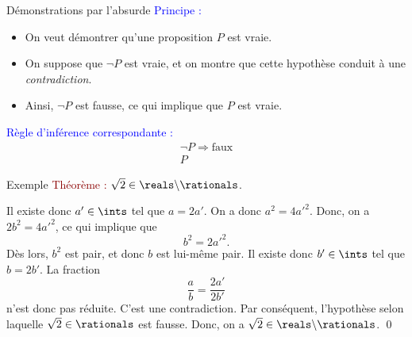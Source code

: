 \begin{frame}{Démonstrations par l'absurde}
\textcolor{blue}{Principe :}
\begin{itemize}
\item On veut démontrer qu'une proposition $P$ est vraie.
\item On suppose que $\neg P$ est vraie, et on montre que cette hypothèse
conduit à une {\em contradiction}.
\item Ainsi, $\neg P$ est fausse, ce qui implique que $P$ est vraie.
\end{itemize}

\bigskip

\textcolor{blue}{Règle d'inférence correspondante :}
\[
\begin{array}{c}
\neg P \Rightarrow \mbox{faux} \\ \hline
P
\end{array}
\] 
\end{frame}

\begin{frame}{Exemple}
\textcolor{darkred}{Théorème :} $\sqrt{2} \in \reals \backslash \rationals$.

\bigskip
{}

\end{frame}

\begin{frame}
Il existe donc $a' \in \ints$ tel que $a = 2a'$. On a
donc $a^2 = 4a'^2$.  Donc, on a $2b^2 = 4a'^2$, ce qui implique que
\[b^2 = 2a'^2.\]  Dès lors, $b^2$ est pair, et donc $b$ est lui-même pair.
Il existe donc $b' \in \ints$ tel que $b = 2b'$. La fraction
\[
\frac{a}{b} = \frac{2a'}{2b'}
\]
n'est donc pas réduite.  C'est une contradiction.  Par conséquent,
l'hypothèse selon laquelle $\sqrt{2} \in \rationals$ est fausse.
Donc, on a $\sqrt{2} \in \reals \backslash \rationals$.
\qed
\end{frame}

